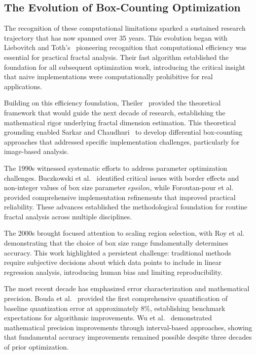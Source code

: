 \documentclass[preprint,12pt]{elsarticle}
\def\epsilon{epsilon}%
\begin{document}
\subsection{The Evolution of Box-Counting Optimization}

The recognition of these computational limitations sparked a sustained research trajectory that has now spanned over 35 years. This evolution began with Liebovitch and Toth's~\cite{liebovitch1989} pioneering recognition that computational efficiency was essential for practical fractal analysis. Their fast algorithm established the foundation for all subsequent optimization work, introducing the critical insight that naive implementations were computationally prohibitive for real applications.

Building on this efficiency foundation, Theiler~\cite{theiler1990} provided the theoretical framework that would guide the next decade of research, establishing the mathematical rigor underlying fractal dimension estimation. This theoretical grounding enabled Sarkar and Chaudhuri~\cite{sarkar1994} to develop differential box-counting approaches that addressed specific implementation challenges, particularly for image-based analysis.

The 1990s witnessed systematic efforts to address parameter optimization challenges. Buczkowski et al.~\cite{buczkowski1998} identified critical issues with border effects and non-integer values of box size parameter $\epsilon$, while Foroutan-pour et al.~\cite{foroutan1999} provided comprehensive implementation refinements that improved practical reliability. These advances established the methodological foundation for routine fractal analysis across multiple disciplines.

The 2000s brought focused attention to scaling region selection, with Roy et al.~\cite{roy2007} demonstrating that the choice of box size range fundamentally determines accuracy. This work highlighted a persistent challenge: traditional methods require subjective decisions about which data points to include in linear regression analysis, introducing human bias and limiting reproducibility.

The most recent decade has emphasized error characterization and mathematical precision. Bouda et al.~\cite{bouda2016} provided the first comprehensive quantification of baseline quantization error at approximately 8\%, establishing benchmark expectations for algorithmic improvements. Wu et al.~\cite{wu2020} demonstrated mathematical precision improvements through interval-based approaches, showing that fundamental accuracy improvements remained possible despite three decades of prior optimization.
\end{document}
